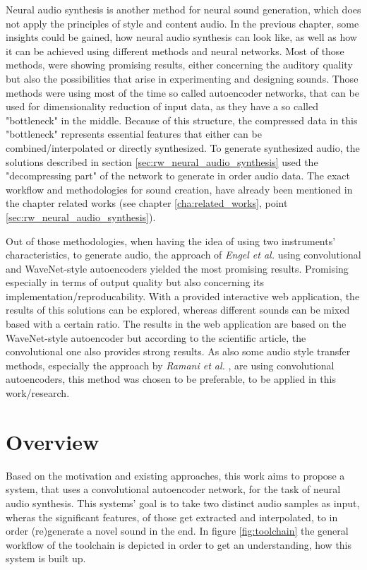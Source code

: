 Neural audio synthesis is another method for neural sound generation, which does not apply the principles of style and content audio. In the previous chapter, some insights could be gained, how neural audio synthesis can look like, as well as how it can be achieved using different methods and neural networks. Most of those methods, were showing promising results, either concerning the auditory quality but also the possibilities that arise in experimenting and designing sounds. Those methods were using most of the time so called autoencoder networks, that can be used for dimensionality reduction of input data, as they have a so called "bottleneck" in the middle. \cite{hinton2006autoencoder} Because of this structure, the compressed data in this "bottleneck" represents essential features that either can be combined/interpolated or directly synthesized. To generate synthesized audio, the solutions described in section \ref{sec:rw_neural_audio_synthesis} used the "decompressing part" of the network to generate in order audio data. The exact workflow and methodologies for sound creation, have already been mentioned in the chapter related works (see chapter \ref{cha:related_works}, point \ref{sec:rw_neural_audio_synthesis}).

Out of those methodologies, when having the idea of using two instruments' characteristics, to generate audio, the approach of \textit{Engel et al.} \cite{Engel2017} using convolutional and WaveNet-style autoencoders yielded the most promising results. Promising especially in terms of output quality but also concerning its implementation/reproducability. With a provided interactive web application, the results of this solutions can be explored, whereas different sounds can be mixed based with a certain ratio. The results in the web application are based on the WaveNet-style autoencoder but according to the scientific article, the convolutional one also provides strong results. As also some audio style transfer methods, especially the approach by \textit{Ramani et al.} \cite{Ramani2018}, are using convolutional autoencoders, this method was chosen to be preferable, to be applied in this work/research. 

\section{Overview}
\label{sec:app_overview}
Based on the motivation and existing approaches, this work aims to propose a system, that uses a convolutional autoencoder network, for the task of neural audio synthesis. This systems' goal is to take two distinct audio samples as input, wheras the significant features, of those get extracted and interpolated, to in order (re)generate a novel sound in the end. In figure \ref{fig:toolchain} the general workflow of the toolchain is depicted in order to get an understanding, how this system is built up. 

